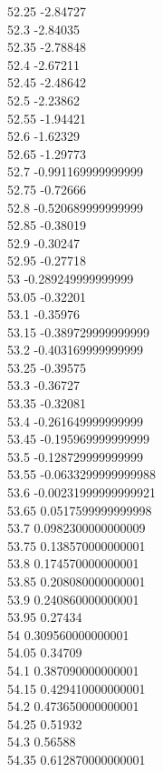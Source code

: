 {52.25	-2.84727\\
52.3	-2.84035\\
52.35	-2.78848\\
52.4	-2.67211\\
52.45	-2.48642\\
52.5	-2.23862\\
52.55	-1.94421\\
52.6	-1.62329\\
52.65	-1.29773\\
52.7	-0.991169999999999\\
52.75	-0.72666\\
52.8	-0.520689999999999\\
52.85	-0.38019\\
52.9	-0.30247\\
52.95	-0.27718\\
53	-0.289249999999999\\
53.05	-0.32201\\
53.1	-0.35976\\
53.15	-0.389729999999999\\
53.2	-0.403169999999999\\
53.25	-0.39575\\
53.3	-0.36727\\
53.35	-0.32081\\
53.4	-0.261649999999999\\
53.45	-0.195969999999999\\
53.5	-0.128729999999999\\
53.55	-0.0633299999999988\\
53.6	-0.00231999999999921\\
53.65	0.0517599999999998\\
53.7	0.0982300000000009\\
53.75	0.138570000000001\\
53.8	0.174570000000001\\
53.85	0.208080000000001\\
53.9	0.240860000000001\\
53.95	0.27434\\
54	0.309560000000001\\
54.05	0.34709\\
54.1	0.387090000000001\\
54.15	0.429410000000001\\
54.2	0.473650000000001\\
54.25	0.51932\\
54.3	0.56588\\
54.35	0.612870000000001\\
}
